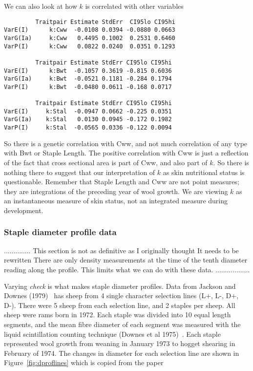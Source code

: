 \documentclass[titlepage]{article}  %
\begin{document}
We can also look at how $k$ is correlated with other variables
\begin{verbatim}
         Traitpair Estimate StdErr  CI95lo CI95hi
VarE(I)      k:Cww  -0.0108 0.0394 -0.0880 0.0663
VarG(Ia)     k:Cww   0.4495 0.1002  0.2531 0.6460
VarP(I)      k:Cww   0.0822 0.0240  0.0351 0.1293

         Traitpair Estimate StdErr CI95lo CI95hi
VarE(I)      k:Bwt  -0.1057 0.3619 -0.815 0.6036
VarG(Ia)     k:Bwt  -0.0521 0.1181 -0.284 0.1794
VarP(I)      k:Bwt  -0.0480 0.0611 -0.168 0.0717

         Traitpair Estimate StdErr CI95lo CI95hi
VarE(I)     k:Stal  -0.0947 0.0662 -0.225 0.0351
VarG(Ia)    k:Stal   0.0130 0.0945 -0.172 0.1982
VarP(I)     k:Stal  -0.0565 0.0336 -0.122 0.0094
\end{verbatim}
So there is a genetic correlation with Cww, and not much correlation of any type with Bwt or Staple Length. The positive correlation with Cww is just a reflection of the fact that cross sectional area is part of Cww, and also part of $k$. So there is nothing there to suggest that our interpretation of $k$ as skin nutritional status  is questionable. Remember that Staple Length and Cww are not point measures; they are integrations of the preceding year of wool growth.  We are viewing $k$ as an instantaneous measure of skin status, not an integrated measure during development.

\clearpage
\subsubsection{Staple diameter profile data}

..............
This section is not as definitive as I originally thought
It needs to be rewritten
There are only density measurements at the time of the tenth diameter reading along the profile. 
This limits what we can do with these data.
..................

Varying {\em check} is what makes staple diameter profiles. Data from Jackson and Downes (1979)~\cite{jack:79} has sheep from  4 single character selection lines (L+, L-, D+, D-). There were 5 sheep from each selection line, and 2 staples per sheep. All sheep were rams born in 1972. Each staple was divided into 10 equal length segments, and the mean fibre diameter of each segment was measured with the liquid scintillation counting technique (Downes et al 1975)~\cite{down:75}. Each staple represented wool growth from weaning in January 1973 to hogget shearing in February of 1974. The changes in diameter for each selection line are shown in Figure~\ref{fig:dproflines} which is copied from the paper

\end{document}
